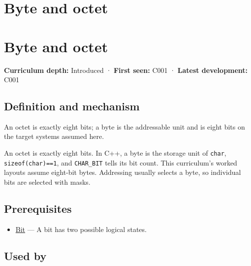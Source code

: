 \hypertarget{appendix-5bee2df85484}{}
\section*{Byte and octet}
\section{Byte and octet}\label{byte-and-octet}

\textbf{Curriculum depth:} Introduced · \textbf{First seen:} C001 · \textbf{Latest development:} C001

\subsection{Definition and mechanism}\label{definition-and-mechanism}

An octet is exactly eight bits; a byte is the addressable unit and is eight bits on the target systems assumed here.

An octet is exactly eight bits. In C++, a byte is the storage unit of \texttt{char}, \texttt{sizeof(char)==1}, and \texttt{CHAR\_BIT} tells its bit count. This curriculum's worked layouts assume eight-bit bytes. Addressing usually selects a byte, so individual bits are selected with masks.

\subsection{Prerequisites}\label{prerequisites}

\begin{itemize}
\tightlist
\item
  \hyperref[appendix-ddbb69998a2e]{Bit} --- A bit has two possible logical states.
\end{itemize}

\subsection{Used by}\label{used-by}

